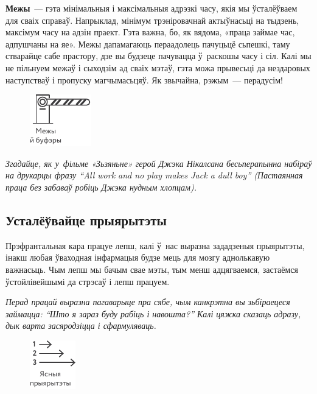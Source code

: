 
\textbf{Межы}~--- гэта мінімальныя і максімальныя адрэзкі часу, якія мы ўсталёўваем для сваіх справаў. Напрыклад, мінімум трэніровачнай актыўнасьці на тыдзень, максімум часу на адзін праект. Гэта важна, бо, як вядома, «праца займае час, адпушчаны на яе». Межы дапамагаюць пераадолець пачуцьцё сьпешкі, таму стварайце сабе прастору, дзе вы будзеце пачувацца ў~раскошы часу і сіл. Калі мы не пільнуем межаў і сыходзім ад сваіх мэтаў, гэта можа прывесьці да нездаровых наступстваў і пропуску магчымасьцяў. Як звычайна, рэжым~--- перадусім!

\begin{figure}[htb!]
  \centering
  \includegraphics[scale=1.5]{willpower/ch7/5.pdf}
\end{figure}

\emph{Згадайце, як у~фільме «Зьзяньне» герой Джэка Нікалсана бесьперапынна набіраў на друкарцы фразу ``All work and no play makes Jack a dull boy'' (Пастаянная праца без забаваў робіць Джэка нудным хлопцам).}

\subsection*{Усталёўвайце прыярытэты}

Прэфрантальная кара працуе лепш, калі ў~нас выразна зададзеныя прыярытэты, інакш любая ўваходная інфармацыя будзе мець для мозгу аднолькавую важнасьць. Чым лепш мы бачым свае мэты, тым менш адцягваемся, застаёмся ўстойлівейшымі да стрэсаў і лепш працуем.

\emph{Перад працай выразна пагаварыце пра сябе, чым канкрэтна вы зьбіраецеся займацца: ``Што я зараз буду рабіць і навошта?'' Калі цяжка сказаць адразу, дык варта засяродзіцца і сфармуляваць.}

\begin{figure}[htb!]
  \centering
  \includegraphics[scale=1.5]{willpower/ch7/6.pdf}
\end{figure}

